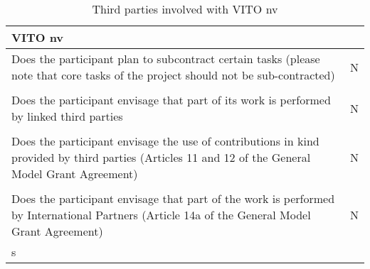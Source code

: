 \begin{table}[H]
	\centering
	\begin{tabular}{|p{10cm}|p{4cm}|}
		\hline
		
		\multicolumn{2}{|p{14cm}|}{\textbf{VITO nv}}\\
		
		\hline
		
		Does the participant plan to subcontract certain tasks (please note that core tasks of the project should not be sub-contracted) & N\\
		
		\hline
		
		\multicolumn{2}{|p{14cm}|}{}\\
		
		\hline
		
		Does the participant envisage that part of its work is performed by linked third parties & N\\
		
		\hline
		
		\multicolumn{2}{|p{14cm}|}{}\\
		
		\hline
		
		Does the participant envisage the use of contributions in kind provided by third parties (Articles 11 and 12 of the General Model Grant Agreement) & N\\
		
		\hline
		
		\multicolumn{2}{|p{14cm}|}{}\\
		
		\hline
		
		Does the participant envisage that part of the work is performed by International Partners (Article 14a of the General Model Grant Agreement) & N\\
		
		\hline
		
		\multicolumn{2}{|p{14cm}|}{s}\\
		
		\hline
	\end{tabular}
	\caption{Third parties involved with VITO nv}
\end{table}